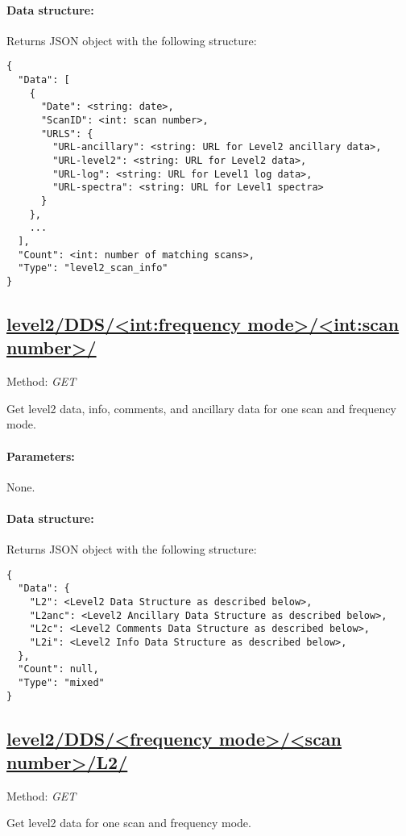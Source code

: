 \paragraph{Data structure:}
Returns JSON object with the following structure:

\begin{lstlisting}[basicstyle=\footnotesize]
{
  "Data": [
    {
      "Date": <string: date>,
      "ScanID": <int: scan number>,
      "URLS": {
        "URL-ancillary": <string: URL for Level2 ancillary data>,
        "URL-level2": <string: URL for Level2 data>,
        "URL-log": <string: URL for Level1 log data>,
        "URL-spectra": <string: URL for Level1 spectra>
      }
    },
    ...
  ],
  "Count": <int: number of matching scans>,
  "Type": "level2_scan_info"
}
\end{lstlisting}


\subsection{\url{level2/DDS/<int:frequency mode>/<int:scan number>/}}
Method: \emph{GET}

Get level2 data, info, comments, and ancillary data for one scan and frequency
mode.

\paragraph{Parameters:} None.

\paragraph{Data structure:}
Returns JSON object with the following structure:

\begin{lstlisting}[basicstyle=\footnotesize]
{
  "Data": {
    "L2": <Level2 Data Structure as described below>,
    "L2anc": <Level2 Ancillary Data Structure as described below>,
    "L2c": <Level2 Comments Data Structure as described below>,
    "L2i": <Level2 Info Data Structure as described below>,
  },
  "Count": null,
  "Type": "mixed"
}
\end{lstlisting}


\subsection{\url{level2/DDS/<frequency mode>/<scan number>/L2/}}
Method: \emph{GET}

Get level2 data for one scan and frequency mode.

